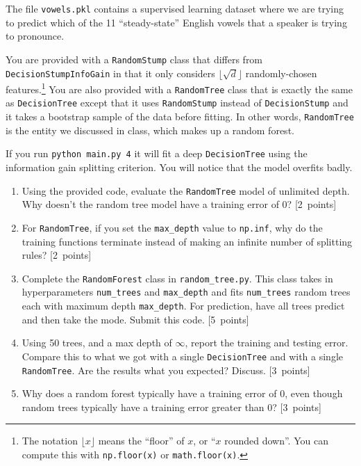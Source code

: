 \documentclass{article}
\newcommand{\blu}[1]{{\textcolor{blu}{#1}}}
\let\ask\blu
\newcommand\pts[1]{\textcolor{pointscolour}{[#1~points]}}
\begin{document}
    The file \texttt{vowels.pkl} contains a supervised learning dataset where we are trying to predict which of the 11 ``steady-state'' English vowels that a speaker is trying to pronounce.

    You are provided with a \texttt{RandomStump} class that differs from
    \texttt{DecisionStumpInfoGain} in that
    it only considers $\lfloor \sqrt{d} \rfloor$ randomly-chosen features.\footnote{The notation $\lfloor x\rfloor$ means the ``floor'' of $x$, or ``$x$ rounded down''. You can compute this with \texttt{np.floor(x)} or \texttt{math.floor(x)}.}
    You are also provided with a \texttt{RandomTree} class that is exactly the same as
    \texttt{DecisionTree} except that it uses \texttt{RandomStump} instead of
    \texttt{DecisionStump} and it takes a bootstrap sample of the data before fitting.
    In other words, \texttt{RandomTree} is the entity we discussed in class, which
    makes up a random forest.

    If you run \texttt{python main.py 4} it will fit a deep \texttt{DecisionTree}
    using the information gain splitting criterion. You will notice that the model overfits badly.




    \begin{enumerate}
        \item Using the provided code, evaluate the \texttt{RandomTree} model of unlimited depth. \ask{Why doesn't the random tree model have a training error of 0?} \pts{2}
        \item For \texttt{RandomTree}, if you set the \texttt{max\_depth} value to \texttt{np.inf}, \ask{why do the training functions terminate instead of making an infinite number of splitting rules?} \pts{2}
        \item Complete the \texttt{RandomForest} class in \texttt{random\string_tree.py}. This class takes in hyperparameters \texttt{num\string_trees} and \texttt{max\string_depth} and
        fits \texttt{num\string_trees} random trees each with maximum depth \texttt{max\string_depth}. For prediction, have all trees predict and then take the mode. \ask{Submit this code.} \pts{5}

        \item Using 50 trees, and a max depth of $\infty$, \ask{report the training and testing error}. Compare this to what we got with a single \texttt{DecisionTree} and with a single \texttt{RandomTree}. \ask{Are the results what you expected? Discuss.} \pts{3}
        \item \ask{Why does a random forest typically have a training error of 0, even though random trees typically have a training error greater than 0?} \pts{3}
    \end{enumerate}
\end{document}
